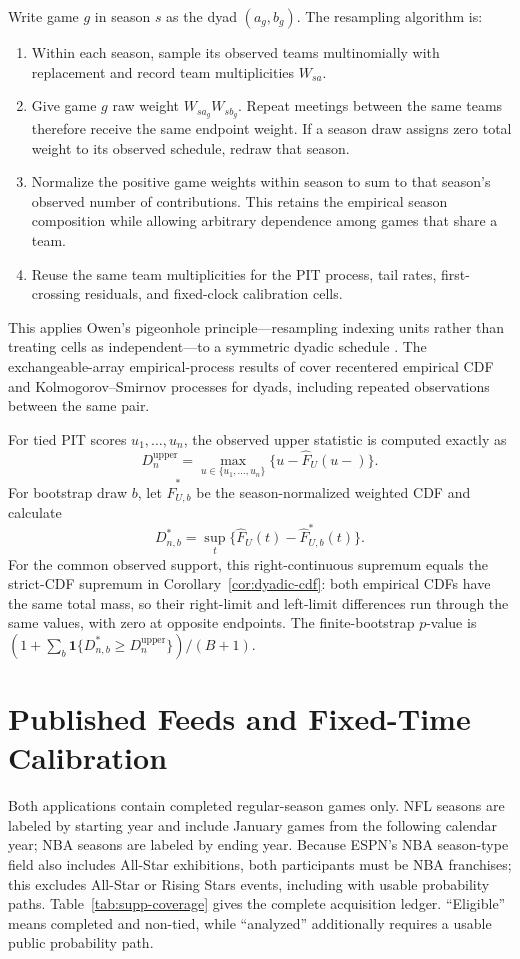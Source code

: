 \documentclass[12pt,letterpaper]{article}
\theoremstyle{plain}
\begin{document}
Write game $g$ in season $s$ as the dyad $(a_g,b_g)$.
The resampling algorithm is:
\begin{enumerate}[leftmargin=2em]
\item Within each season, sample its observed teams multinomially with replacement and record team multiplicities $W_{sa}$.
\item Give game $g$ raw weight $W_{s a_g}W_{s b_g}$. Repeat meetings between the same teams therefore receive the same endpoint weight. If a season draw assigns zero total weight to its observed schedule, redraw that season.
\item Normalize the positive game weights within season to sum to that season's observed number of contributions. This retains the empirical season composition while allowing arbitrary dependence among games that share a team.
\item Reuse the same team multiplicities for the PIT process, tail rates, first-crossing residuals, and fixed-clock calibration cells.
\end{enumerate}
This applies Owen's pigeonhole principle---resampling indexing units rather than treating cells as independent---to a symmetric dyadic schedule \citep{Owen2007}.
The exchangeable-array empirical-process results of \citet{DaveziesDHAultfoeuilleGuyonvarch2021} cover recentered empirical CDF and Kolmogorov--Smirnov processes for dyads, including repeated observations between the same pair.

For tied PIT scores $u_1,\ldots,u_n$, the observed upper statistic is computed exactly as
\[
D_n^{\mathrm{upper}}
=\max_{u\in\{u_1,\ldots,u_n\}}\{u-\hat F_U(u-)\}.
\]
For bootstrap draw $b$, let $\hat F_{U,b}^*$ be the season-normalized weighted CDF and calculate
\[
D_{n,b}^*=\sup_t\{\hat F_U(t)-\hat F_{U,b}^*(t)\}.
\]
For the common observed support, this right-continuous supremum equals the strict-CDF supremum in Corollary~\ref{cor:dyadic-cdf}: both empirical CDFs have the same total mass, so their right-limit and left-limit differences run through the same values, with zero at opposite endpoints.
The finite-bootstrap $p$-value is $(1+\sum_b\mathbf 1\{D_{n,b}^*\ge D_n^{\mathrm{upper}}\})/(B+1)$.

\section{Published Feeds and Fixed-Time Calibration} \label{sec:supp-data}

Both applications contain completed regular-season games only.
NFL seasons are labeled by starting year and include January games from the following calendar year; NBA seasons are labeled by ending year.
Because ESPN's NBA season-type field also includes All-Star exhibitions, both participants must be NBA franchises; this excludes \NBAExcludedExhibitionEvents{} All-Star or Rising Stars events, including \NBAExcludedExhibitionFeeds{} with usable probability paths.
Table~\ref{tab:supp-coverage} gives the complete acquisition ledger.
``Eligible'' means completed and non-tied, while ``analyzed'' additionally requires a usable public probability path.
\end{document}
